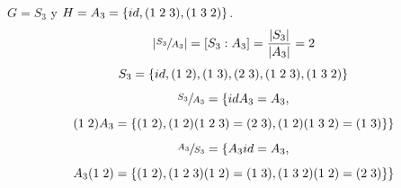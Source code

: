 \documentclass[11pt,a4paper]{article}
\begin{document}
$G = S_{3}$ y $H = A_{3} = \{id, (1 \hspace{0.1cm} 2 \hspace{0.1cm} 3), (1 \hspace{0.1cm} 3 \hspace{0.1cm} 2) \}$.
$$|\sfrac{S_{3}}{A_{3}}| = [S_{3}:A_{3}] = \frac{|S_{3}|}{|A_{3}|} = 2$$
$$S_{3} = \{id, (1 \hspace{0.1cm} 2), (1 \hspace{0.1cm} 3), (2 \hspace{0.1cm} 3), (1 \hspace{0.1cm} 2 \hspace{0.1cm} 3), (1 \hspace{0.1cm} 3 \hspace{0.1cm} 2) \}$$
$$\sfrac{S_{3}}{A_{3}} = \{idA_{3} = A_{3},$$ $$(1 \hspace{0.1cm} 2) A_{3} = \{(1 \hspace{0.1cm} 2), (1 \hspace{0.1cm} 2)(1 \hspace{0.1cm} 2 \hspace{0.1cm} 3) = (2 \hspace{0.1cm} 3), (1 \hspace{0.1cm} 2)(1 \hspace{0.1cm} 3 \hspace{0.1cm} 2) = (1 \hspace{0.1cm} 3)\} \}$$
$$\sfrac{A_{3}}{S_{3}} = \{A_{3}id = A_{3},$$ $$A_{3}(1 \hspace{0.1cm} 2) = \{(1 \hspace{0.1cm} 2), (1 \hspace{0.1cm} 2 \hspace{0.1cm} 3)(1 \hspace{0.1cm} 2) = (1 \hspace{0.1cm} 3), (1 \hspace{0.1cm} 3 \hspace{0.1cm} 2)(1 \hspace{0.1cm} 2) = (2 \hspace{0.1cm} 3)\} \}$$
\end{document}
